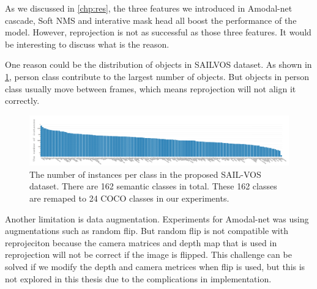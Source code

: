 As we discussed in \ref{chp:res}, the three features we introduced in Amodal-net \ie cascade, Soft NMS and interative mask head all boost the performance of the model. However, reprojection is not as successful as those three features. It would be interesting to discuss what is the reason.

One reason could be the distribution of objects in SAILVOS dataset. As shown in \ref{fig:sailvos_cls}, person class contribute to the largest number of objects. But objects in person class usually move between frames, which means reprojection will not align it correctly.

\begin{figure}[t]
\centering
\includegraphics[scale=0.23]{fig/sailvos_cls_dist.png}

\caption{The number of instances per class in the proposed SAIL-VOS dataset. There are 162 semantic classes in total. These 162 classes are remaped to 24 COCO classes in our experiments. }
\label{fig:sailvos_cls}
\end{figure}

Another limitation is data augmentation. Experiments for Amodal-net was using augmentations such as random flip. But random flip is not compatible with reprojeciton because the camera matrices and depth map that is used in reprojection will not be correct if the image is flipped. This challenge can be solved if we modify the depth and camera metrices when flip is used, but this is not explored in this thesis due to the complications in implementation.